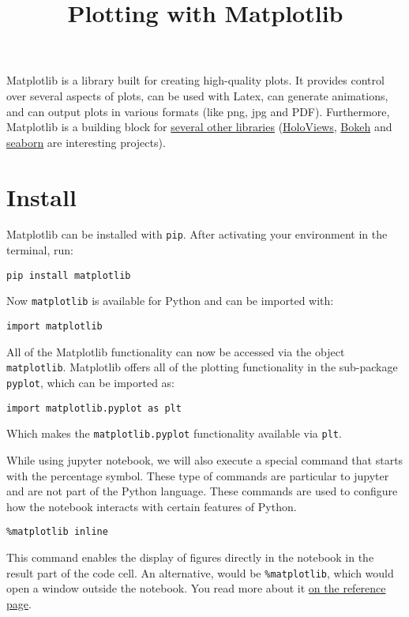 \documentclass[12pt, a4paper]{article}
\date{}
\title{Plotting with Matplotlib}
\begin{document}
\maketitle
Matplotlib is a library built for creating high-quality plots.
It provides control over several aspects of plots, can be used with Latex, can generate animations, and can output plots in various formats (like png, jpg and PDF).
Furthermore, Matplotlib is a building block for \href{https://matplotlib.org/thirdpartypackages/index.html}{several other libraries} (\href{http://holoviews.org/index.html}{HoloViews}, \href{https://bokeh.pydata.org/en/latest/}{Bokeh} and \href{http://seaborn.pydata.org}{seaborn} are interesting projects).
\section{Install}
\label{sec:org6cc8feb}
Matplotlib can be installed with \texttt{pip}.
After activating your environment in the terminal, run:
\lstset{language=jupyter-python,label= ,caption= ,captionpos=b,numbers=none}
\begin{lstlisting}
pip install matplotlib
\end{lstlisting}
Now \texttt{matplotlib} is available for Python and can be imported with:
\lstset{language=jupyter-python,label= ,caption= ,captionpos=b,numbers=none}
\begin{lstlisting}
import matplotlib
\end{lstlisting}
All of the Matplotlib functionality can now be accessed via the object \texttt{matplotlib}.
Matplotlib offers all of the plotting functionality in the sub-package \texttt{pyplot}, which can be imported as:
\lstset{language=jupyter-python,label= ,caption= ,captionpos=b,numbers=none}
\begin{lstlisting}
import matplotlib.pyplot as plt
\end{lstlisting}
Which makes the \texttt{matplotlib.pyplot} functionality available via \texttt{plt}.

While using jupyter notebook, we will also execute a special command that starts with the percentage symbol.
These type of commands are particular to jupyter and are not part of the Python language.
These commands are used to configure how the notebook interacts with certain features of Python.
\lstset{language=jupyter-python,label= ,caption= ,captionpos=b,numbers=none}
\begin{lstlisting}
%matplotlib inline
\end{lstlisting}
This command enables the display of figures directly in the notebook in the result part of the code cell.
An alternative, would be \texttt{\%matplotlib}, which would open a window outside the notebook.
You read more about it \href{https://ipython.readthedocs.io/en/stable/interactive/magics.html\#magic-matplotlib}{on the reference page}.
\end{document}
